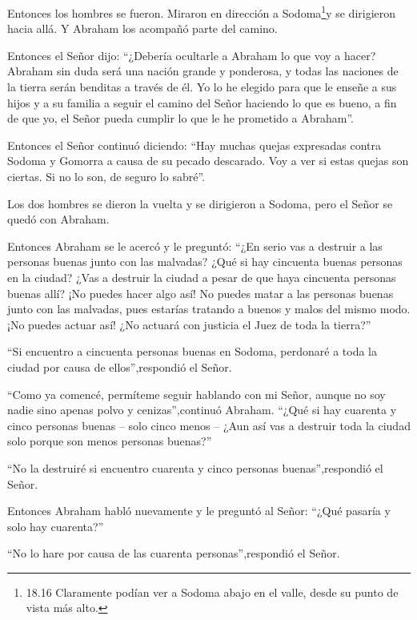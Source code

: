  Entonces los hombres se fueron. Miraron en dirección a
Sodoma\footnote{18.16 Claramente podían ver a Sodoma abajo en el valle,
  desde su punto de vista más alto.}y se dirigieron hacia allá. Y
Abraham los acompañó parte del camino.

 Entonces el Señor dijo: ``¿Debería ocultarle a Abraham lo
que voy a hacer?  Abraham sin duda será una nación grande y
ponderosa, y todas las naciones de la tierra serán benditas a través de
él.  Yo lo he elegido para que le enseñe a sus hijos y a su
familia a seguir el camino del Señor haciendo lo que es bueno, a fin de
que yo, el Señor pueda cumplir lo que le he prometido a Abraham''.

 Entonces el Señor continuó diciendo: ``Hay muchas quejas
expresadas contra Sodoma y Gomorra a causa de su pecado descarado.
 Voy a ver si estas quejas son ciertas. Si no lo son, de
seguro lo sabré''.

 Los dos hombres se dieron la vuelta y se dirigieron a
Sodoma, pero el Señor se quedó con Abraham.

 Entonces Abraham se le acercó y le preguntó: ``¿En serio
vas a destruir a las personas buenas junto con las malvadas?
 ¿Qué si hay cincuenta buenas personas en la ciudad? ¿Vas a
destruir la ciudad a pesar de que haya cincuenta personas buenas allí?
 ¡No puedes hacer algo así! No puedes matar a las personas
buenas junto con las malvadas, pues estarías tratando a buenos y malos
del mismo modo. ¡No puedes actuar así! ¿No actuará con justicia el Juez
de toda la tierra?''

 ``Si encuentro a cincuenta personas buenas en Sodoma,
perdonaré a toda la ciudad por causa de ellos'',respondió el Señor.

 ``Como ya comencé, permíteme seguir hablando con mi Señor,
aunque no soy nadie sino apenas polvo y cenizas'',continuó Abraham.
 ``¿Qué si hay cuarenta y cinco personas buenas -- solo
cinco menos -- ¿Aun así vas a destruir toda la ciudad solo porque son
menos personas buenas?''

``No la destruiré si encuentro cuarenta y cinco personas
buenas'',respondió el Señor.

 Entonces Abraham habló nuevamente y le preguntó al Señor:
``¿Qué pasaría y solo hay cuarenta?''

``No lo hare por causa de las cuarenta personas'',respondió el Señor.

